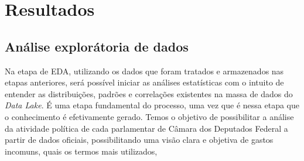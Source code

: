 \chapter{Resultados}
\label{resultados}

\section{Análise explorátoria de dados} Na etapa de \ac{EDA}, utilizando os dados que foram tratados e armazenados nas etapas anteriores, será possível iniciar as análises estatísticas com o intuito de entender as distribuições, padrões e correlações existentes na massa de dados do \textit{Data Lake}. É uma etapa fundamental do processo, uma vez que é nessa etapa que o conhecimento é efetivamente gerado. Temos o objetivo de possibilitar a análise da atividade política de cada parlamentar de Câmara dos Deputados Federal a partir de dados oficiais, possibilitando uma visão clara e objetiva de gastos incomuns, quais os termos mais utilizados, 
